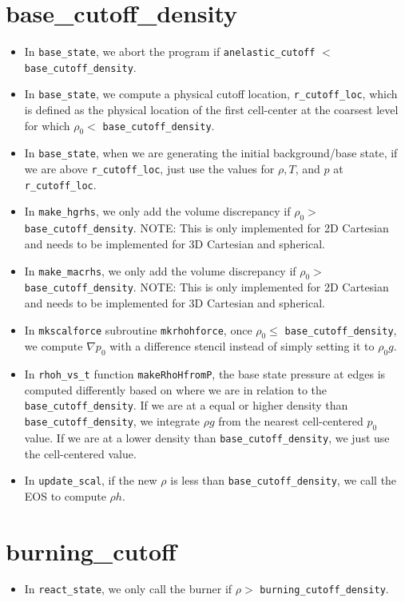 \documentclass[11pt]{article}
\begin{document}
\section{base\_cutoff\_density}
\begin{itemize}
\item In {\tt base\_state}, we abort the program if {\tt anelastic\_cutoff} $<$ {\tt base\_cutoff\_density}.
\item In {\tt base\_state}, we compute a physical cutoff location, {\tt r\_cutoff\_loc}, which is defined as the physical location of the first cell-center at the coarsest level for which $\rho_0 <$ {\tt base\_cutoff\_density}.
\item In {\tt base\_state}, when we are generating the initial background/base state, if we are above {\tt r\_cutoff\_loc}, just use the values for $\rho,T$, and $p$ at {\tt r\_cutoff\_loc}.
\item In {\tt make\_hgrhs}, we only add the volume discrepancy if $\rho_0 >$ {\tt base\_cutoff\_density}.  NOTE: This is only implemented for 2D Cartesian and needs to be implemented for 3D Cartesian and spherical.
\item In {\tt make\_macrhs}, we only add the volume discrepancy if $\rho_0 >$ {\tt base\_cutoff\_density}.  NOTE: This is only implemented for 2D Cartesian and needs to be implemented for 3D Cartesian and spherical.
\item In {\tt mkscalforce} subroutine {\tt mkrhohforce}, once $\rho_0 \le$ {\tt base\_cutoff\_density}, we compute $\nabla p_0$ with a difference stencil instead of simply setting it to $\rho_0 g$.
\item In {\tt rhoh\_vs\_t} function {\tt makeRhoHfromP}, the base state pressure at edges is computed differently based on where we are in relation to the {\tt base\_cutoff\_density}.  If we are at a equal or higher density than {\tt base\_cutoff\_density}, we integrate $\rho g$ from the nearest cell-centered $p_0$ value.  If we are at a lower density than {\tt base\_cutoff\_density}, we just use the cell-centered value.
\item In {\tt update\_scal}, if the new $\rho$ is less than {\tt base\_cutoff\_density}, we call the EOS to compute $\rho h$.
\end{itemize}
\section{burning\_cutoff}
\begin{itemize}
\item In {\tt react\_state}, we only call the burner if $\rho >$ {\tt burning\_cutoff\_density}.
\end{itemize}
\end{document}
